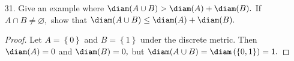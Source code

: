 \documentclass{article}
\begin{document}
\begin{itemize}
		Theorem 3.8': Let $1<p<\infty.$ If $f, g\in C([0, 1]).$ then $\left\lVert f+g \right\rVert_p\le \left\lVert f \right\rVert_p + \left\lVert g \right\rVert_p.$
		\begin{proof}
			Let $q$ be the conjugate of $p.$ By the triangle inequality and Holder's inequality, we have
			\begin{align*}
				\abs{f(x)+g(x)}^p &= \abs{f(x)+g(x)}\cdot \abs{f(x)+g(x)}^{p-1} \\
				&\le \abs{f(x)}\cdot \abs{f(x)+g(x)}^{p-1} + \abs{g(x)}\cdot \abs{f(x)+g(x)}^{p-1} \\
				\implies \int_0^1\abs{f(x)+g(x)}^p\, dx &\le \int_0^1 \abs{f(x)}\cdot \abs{f(x)+g(x)}^{p-1}\, dx + \int_0^1 \abs{g(x)}\cdot \abs{f(x)+g(x)}^{p-1}\, dx \\
				&\le \left\lVert f \right\rVert_p \left\lVert (f+g)^{p-1} \right\rVert_q + \left\lVert g \right\rVert_p\left\lVert (f+g)^{p-1} \right\rVert_q 
			\end{align*}
			Now, since $1/p+1/q=1\implies q=\frac{p}{p-1},$ we have
			\begin{align*}
				\left\lVert (f+g)^{p-1} \right\rVert_q &= \left(\int_0^1 \abs{\left(f(x)+g(x\right))^{p-1}}^{\frac{p}{p-1}}\, dx\right)^{\frac{p-1}{p}} \\
				&= \left(\left( \int_0^1 \abs{f(x)+g(x)}^p\, dx \right)^{1/p}\right)^{(p-1)} \\
				&= \left\lVert f+g \right\rVert_p^{p-1}
			\end{align*}
			so it follows that
			\begin{align*}
				\int_0^1\abs{f(x)+g(x)}^p\, dx = \left\lVert f+g \right\rVert_p^p &\le \left(\left\lVert f \right\rVert_p + \left\lVert g \right\rVert_p\right)\cdot \left\lVert f+g \right\rVert_p^{p-1} \\
				\implies \left\lVert f+g\right\rVert_p &\le \left\lVert f \right\rVert_p + \left\lVert g \right\rVert_p
			\end{align*}
			as desired.
		\end{proof}

	\item[31.] Give an example where $\diam(A\cup B)>\diam(A)+\diam(B).$ If $A\cap B\neq\varnothing,$ show that $\diam(A\cup B)\le \diam(A)+\diam(B).$
		\begin{proof}
			Let $A=\left\{ 0 \right\}$ and $B=\left\{ 1 \right\}$ under the discrete metric. Then $\diam(A)=0$ and $\diam(B)=0,$ but $\diam(A\cup B)=\diam\left( \left\{ 0, 1 \right\} \right) = 1.$


\end{proof}
\end{itemize}
\end{document}
